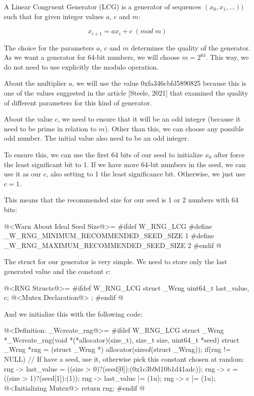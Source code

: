 

A Linear Congruent Generator (LCG) is a generator of sequences $(x_0,
x_1, \ldots))$ such that for given integer values $a$, $c$ and $m$:

$$
x_{i+1}=ax_i+c\; (mod\; m)
$$

The choice for the parameters $a$, $c$ and $m$ determines the quality
of the generator. As we want a generator for 64-bit numbers, we will
choose $m=2^{64}$. This way, we do not need to use explicitly the
modulo operation.

About the multiplier $a$, we will use the value 0xfa346cbfd5890825
because this is one of the values suggested in the article [Steele,
2021] that examined the quality of different parameters for this kind
of generator.

About the value $c$, we need to ensure that it will be an odd integer
(because it need to be prime in relation to $m$). Other than this, we
can choose any possible odd number. The initial value also need to be
an odd integer.

To ensure this, we can use the first 64 bits of our seed to initialize
$x_0$ after force the least significant bit to 1. If we have more
64-bit numbers in the seed, we can use it as our $c$, also setting to
1 the least significance bit. Otherwise, we just use $c=1$.


This means that the recommended size for our seed is 1 or 2 numbers
with 64 bits:

\iniciocodigo
@<Warn About Ideal Seed Size@>=
#ifdef W_RNG_LCG
#define _W_RNG_MINIMUM_RECOMMENDED_SEED_SIZE  1
#define _W_RNG_MAXIMUM_RECOMMENDED_SEED_SIZE  2
#endif
@
\fimcodigo

The struct for our generator is very simple. We need to store only the
last generated value and the constant $c$:

\iniciocodigo
@<RNG Structs@>=
#ifdef W_RNG_LCG
struct _Wrng{
  uint64_t last_value, c;
  @<Mutex Declaration@>
};
#endif
@
\fimcodigo

And we initialize this with the following code:

\iniciocodigo
@<Definition: \_Wcreate\_rng@>=
#ifdef W_RNG_LCG
struct _Wrng *_Wcreate_rng(void *(*allocator)(size_t), size_t size,
                           uint64_t *seed){
  struct _Wrng *rng = (struct _Wrng *) allocator(sizeof(struct _Wrng));
  if(rng != NULL){
    // If have a seed, use it, otherwise pick this constant chosen at random:
    rng -> last_value = ((size > 0)?(seed[0]):(0x1c3b9d10b1d41adc));
    rng -> c = ((size > 1)?(seed[1]):(1));
    rng -> last_value |= (1u);
    rng -> c |= (1u);
    @<Initializing Mutex@>
  }
  return rng;
}
#endif
@
\fimcodigo

